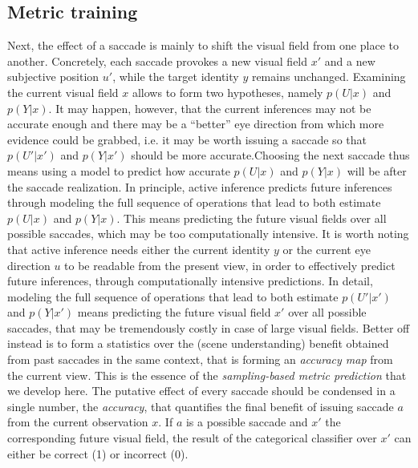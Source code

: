 \subsection{Metric training}
Next, the effect of a saccade is mainly to shift the visual field from one place to another.
\ICANN Concretely, each saccade provokes a new visual field $x'$ and a new subjective position $u'$, while the target identity $y$ remains unchanged. Examining the current visual field $x$ allows to form two hypotheses, namely $p(U|x)$ and $p(Y|x)$. It may happen, however, that the current inferences may not be accurate enough and there may be a ``better'' eye direction from which more evidence could be grabbed, i.e. it may be worth issuing a saccade so that $p(U'|x')$ and $p(Y|x')$ should be more accurate.\fi Choosing the next saccade thus means using a model to predict how accurate $p(U|x)$ and $p(Y|x)$ will be after the saccade realization.
\ICANN
In principle, active inference predicts future inferences through modeling the full sequence of operations that lead to both estimate $p(U|x)$ and $p(Y|x)$. This means predicting the future visual fields over all possible saccades, which may be too computationally intensive.
\else It is worth noting that active inference needs either the current identity $y$ or the current eye direction $u$ to be readable from the present view, in order to effectively predict future inferences, through computationally intensive predictions. In detail, modeling the full sequence of operations that lead to both estimate $p(U'|x')$ and $p(Y|x')$ means predicting the future visual field $x'$ over all possible saccades, that may be tremendously costly in case of large visual fields.
\fi
Better off instead is to form a statistics over the (scene understanding) benefit obtained from past saccades in the same context, that is forming an \emph{accuracy map} from the current view. This is the essence of the \emph{sampling-based metric prediction} that we develop here. The putative effect of every saccade should be condensed in a single number, the \emph{accuracy}, that quantifies the final benefit of issuing saccade $a$ %
from the current observation $x$. If $a$ is a possible saccade and $x'$ the corresponding future visual field, the result of the categorical classifier over $x'$ can either be correct (1) or incorrect (0).
